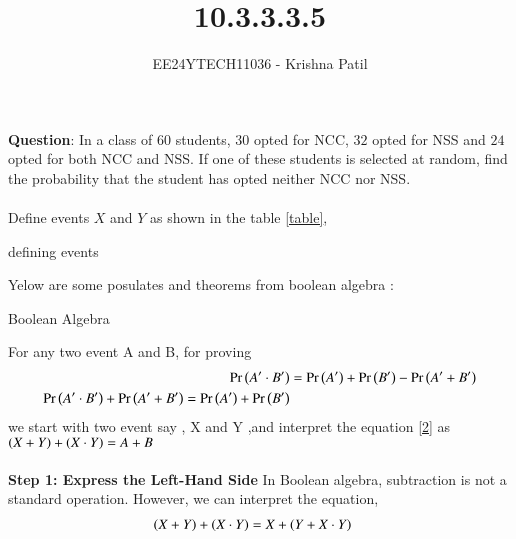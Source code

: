 \documentclass[journal]{IEEEtran}
\begin{document}

\vspace{3cm}

\title{10.3.3.3.5}
\author{EE24YTECH11036 - Krishna Patil}
{\let\newpage\relax\maketitle}
\renewcommand{\thefigure}{\theenumi}
\renewcommand{\thetable}{\theenumi}
\setlength{\intextsep}{10pt} %


\textbf{Question}: In a class of $60$ students, $30$ opted for NCC, $32$ opted for NSS and $24$ opted for both NCC and NSS. If one of these students is selected at random, find the probability that the student has opted neither NCC nor NSS. \\ \\
\solution
Define events $X$ and $Y$ as shown in the table \ref{table}, \\
\begin{table}[h!]    
  \centering
  
  \caption{defining events}
  \label{table}
\end{table}
\newline Yelow are some posulates and theorems from boolean algebra :
\begin{table}[h!]    
  \centering
  
  \caption{Boolean Algebra}
  \label{table2}
\end{table}
\newline For any two event A and B,  for proving 
\begin{align}
\Pr\left(A^\prime \cdot B^\prime\right) &= \Pr\left(A^\prime\right) + \Pr\left(B^\prime\right) - \Pr\left(A^\prime + B^\prime\right) \\
\Pr\left(A^\prime \cdot B^\prime\right) + \Pr\left(A^\prime + B^\prime\right) = \Pr\left(A^\prime\right) + \Pr\left(B^\prime\right) 
\end{align}
we start with two event say , X and Y ,and interpret the equation \ref{2} as $\left(X + Y\right)+\left(X \cdot Y\right) = A + B $ \\ \\
\textbf{Step 1: Express the Left-Hand Side}
In Boolean algebra, subtraction is not a standard operation. However, we can interpret the equation,
\begin{align}
\left(X + Y\right)+\left(X \cdot Y\right) &= X + \left(Y + X \cdot Y\right)  
\end{align}
\end{document}
